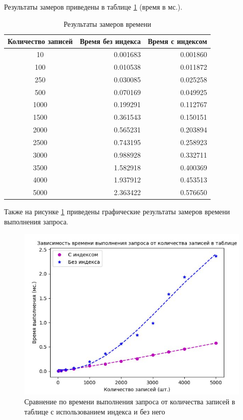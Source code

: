 Результаты замеров приведены в таблице \ref{tbl:time_mes} (время в мс.).
 
\begin{table}[h]
	\begin{center}
		\begin{threeparttable}
			\captionsetup{singlelinecheck=off, justification=raggedright}
			\caption{Результаты замеров времени}
			\label{tbl:time_mes}
			\begin{tabular}{|c|r|r|}
				\hline
				Количество записей & Время без индекса & Время с индексом \\ 
				\hline
				10 & 0.001683 & 0.001860 \\ \hline
				100 & 0.010538 & 0.011872 \\ \hline
				250 & 0.030085 & 0.025258 \\ \hline
				500 & 0.070169 & 0.049925 \\ \hline
				1000 & 0.199291 & 0.112767 \\ \hline
				1500 & 0.361543 & 0.150151 \\ \hline
				2000 & 0.565231 & 0.203894 \\ \hline
				2500 & 0.743195 & 0.258923 \\ \hline
				3000 & 0.988928 & 0.332711 \\ \hline
				3500 & 1.582918 & 0.400369 \\ \hline
				4000 & 1.937912 & 0.453513 \\ \hline
				5000 & 2.363422 & 0.576650 \\ \hline
			\end{tabular}
		\end{threeparttable}
	\end{center}
\end{table}

Также на рисунке \ref{fig:graph} приведены графические результаты замеров времени выполнения запроса.

\clearpage

\begin{figure}[h!]
	\centering
	\includegraphics[width=\linewidth]{img/graph}
	\caption{Сравнение по времени выполнения запроса от количества записей в таблице с использованием индекса и без него}
	\label{fig:graph}
\end{figure}

